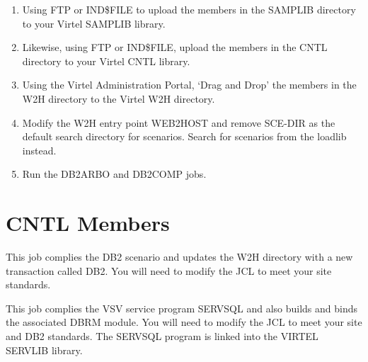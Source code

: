 \documentclass[letterpaper,10pt,english]{sphinxmanual}
\begin{document}
\begin{sphinxVerbatim}[commandchars=\\\{\}]
       
        
        
\end{sphinxVerbatim}
\begin{enumerate}
\def\theenumi{\arabic{enumi}}
\def\labelenumi{\theenumi .}
\makeatletter\def\p@enumii{\p@enumi \theenumi .}\makeatother
\setcounter{enumi}{3}
\item {} 
Using FTP or IND\$FILE to upload the members in the SAMPLIB directory to your Virtel SAMPLIB library.

\item {} 
Likewise, using FTP or IND\$FILE, upload the members in the CNTL directory to your Virtel CNTL library.

\item {} 
Using the Virtel Administration Portal, ‘Drag and Drop’ the members in the W2H directory to the Virtel W2H directory.

\item {} 
Modify the W2H entry point WEB2HOST and remove SCE-DIR as the default search directory for scenarios. Search for scenarios from the loadlib instead.

\item {} 
Run the DB2ARBO and DB2COMP jobs.

\end{enumerate}


\section{CNTL Members}
\label{\detokenize{TN201906:cntl-members}}

This job complies the DB2 scenario and updates the W2H directory with a new transaction called DB2. You will need to modify the JCL to meet your site standards.


This job complies the VSV service program SERVSQL and also builds and binds the associated DBRM module. You will need to modify the JCL to meet your site and DB2 standards. The SERVSQL program is linked into the VIRTEL SERVLIB library.

\end{document}
